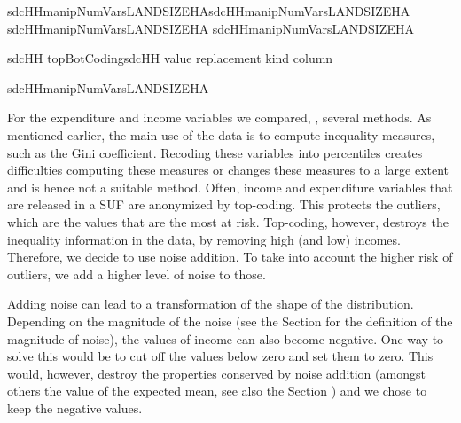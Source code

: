 \documentclass[letterpaper,10pt,english]{sphinxmanual}
\begin{document}
\begin{sphinxVerbatim}[commandchars=\\\{\},numbers=left,firstnumber=1,stepnumber=1]
sdcHHmanipNumVarsLANDSIZEHA\PYG{p}{[}sdcHHmanipNumVarsLANDSIZEHA   
sdcHHmanipNumVarsLANDSIZEHA   sdcHHmanipNumVarsLANDSIZEHA\PYG{p}{]}  

sdcHH  topBotCodingsdcHH value   replacement   kind   column  

sdcHHmanipNumVarsLANDSIZEHA
\end{sphinxVerbatim}

For the expenditure and income variables we compared, , several methods. As mentioned earlier, the
main use of the data is to compute inequality measures, such as the Gini
coefficient. Recoding these variables into percentiles creates
difficulties computing these measures or changes these measures to a
large extent and is hence not a suitable method. Often, income and
expenditure variables that are released in a SUF are anonymized by
top-coding. This protects the outliers, which are the values that are
the most at risk. Top-coding, however, destroys the inequality
information in the data, by removing high (and low) incomes. Therefore,
we decide to use noise addition. To take into account the higher risk of
outliers, we add a higher level of noise to those.

Adding noise can lead to a transformation of the shape of the
distribution. Depending on the magnitude of the noise (see the Section
for the definition of the magnitude of noise), the values of income can
also become negative. One way to solve this would be to cut off the
values below zero and set them to zero. This would, however, destroy the
properties conserved by noise addition (amongst others the value of the
expected mean, see also the Section )
and we chose to keep the negative values.
\end{document}
